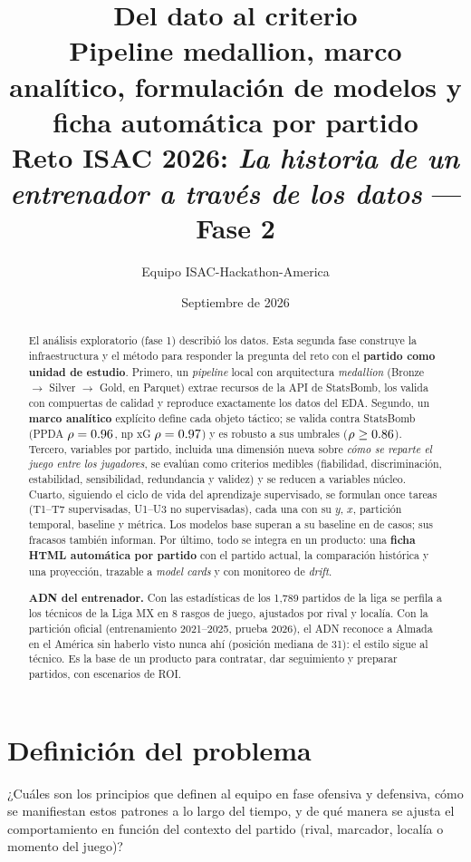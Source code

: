 \documentclass[11pt,a4paper]{article}
\title{\textbf{Del dato al criterio}\\[4pt]
\large Pipeline medallion, marco analítico, formulación de modelos y ficha automática por partido\\[2pt]
\normalsize Reto ISAC 2026: \emph{La historia de un entrenador a través de los datos} --- Fase 2}
\author{Equipo ISAC-Hackathon-America}
\date{Septiembre de 2026}
\begin{document}
\maketitle
\thispagestyle{empty}

\begin{abstract}
\noindent El análisis exploratorio (fase 1) describió los datos. Esta segunda fase construye la infraestructura y el
método para responder la pregunta del reto con el \textbf{partido como unidad de estudio}. Primero, un \emph{pipeline}
local con arquitectura \emph{medallion} (Bronze $\rightarrow$ Silver $\rightarrow$ Gold, en Parquet) extrae \nRecursos{}
recursos de la API de StatsBomb, los valida con compuertas de calidad y reproduce exactamente los datos del EDA.
Segundo, un \textbf{marco analítico} explícito define cada objeto táctico; se valida contra StatsBomb (PPDA
$\rho=0.96$, np xG $\rho=0.97$) y es robusto a sus umbrales ($\rho\geq0.86$). Tercero, \nVariables{}
variables por partido, incluida una dimensión nueva sobre \emph{cómo se reparte el juego entre los jugadores}, se evalúan
como criterios medibles (fiabilidad, discriminación, estabilidad, sensibilidad, redundancia y validez) y se reducen a
\nNucleo{} variables núcleo. Cuarto, siguiendo el ciclo de vida del aprendizaje supervisado, se formulan once tareas
(T1--T7 supervisadas, U1--U3 no supervisadas), cada una con su $y$, $x$, partición temporal, baseline y métrica.
Los modelos base superan a su baseline en \nSupera{} de \nSupervisados{} casos; sus fracasos también informan. Por
último, todo se integra en un producto: una \textbf{ficha HTML automática por partido} con el partido actual, la
comparación histórica y una proyección, trazable a \emph{model cards} y con monitoreo de \emph{drift}.
\par\smallskip\noindent\textbf{ADN del entrenador.} Con las estadísticas de los 1,789 partidos de la liga se perfila a
los \nTecnicos{} técnicos de la Liga MX en 8 rasgos de juego, ajustados por rival y localía. Con la partición oficial
(entrenamiento 2021--2025, prueba 2026), el ADN reconoce a Almada en el América sin haberlo visto nunca ahí (posición
mediana \almadaRank{} de 31): el estilo sigue al técnico. Es la base de un producto para contratar, dar seguimiento y
preparar partidos, con escenarios de ROI.
\end{abstract}

\tableofcontents
\newpage

\section{Definición del problema}\label{sec:problema}
\begin{historia}
¿Cuáles son los principios que definen al equipo en fase ofensiva y defensiva, cómo se manifiestan estos patrones a lo
largo del tiempo, y de qué manera se ajusta el comportamiento en función del contexto del partido (rival, marcador,
localía o momento del juego)?
\end{historia}
\end{document}
